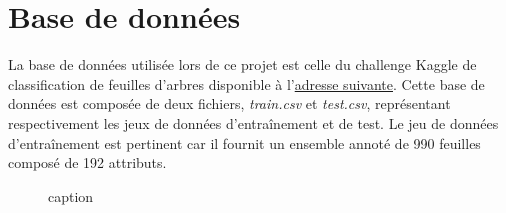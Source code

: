 \section{Base de données}
La base de données utilisée lors de ce projet est celle du challenge Kaggle de classification de feuilles d'arbres disponible à l'\href{www.kaggle.com/c/leaf-classification}{adresse suivante}.
Cette base de données est composée de deux fichiers, \emph{train.csv} et \emph{test.csv}, représentant respectivement les jeux de données d'entraînement et de test.  
Le jeu de données d'entraînement est pertinent car il fournit un ensemble annoté de 990 feuilles composé de 192 attributs.
    
    \begin{figure}[H]
        \centering
        \caption{caption}
        \label{fig:outil_annotation}
    \end{figure}

